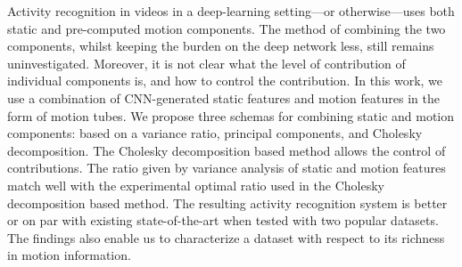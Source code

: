 Activity recognition in videos in a deep-learning setting---or otherwise---uses both static and pre-computed motion components. The method of combining the two components, whilst keeping the burden on the deep network less, still remains uninvestigated. Moreover, it is not clear what the level of contribution of individual components is, and how to control the contribution. In this work, we use a combination of CNN-generated static features and motion features in the form of motion tubes. We propose three schemas for combining static and motion components: based on a variance ratio, principal components, and Cholesky decomposition. The Cholesky decomposition based method allows the control of contributions. The ratio given by variance analysis of static and motion features match well with the experimental optimal ratio used in the Cholesky decomposition based method. The resulting activity recognition system is better or on par with existing state-of-the-art when tested with two popular datasets. The findings also enable us to characterize a dataset with respect to its richness in motion information. 
